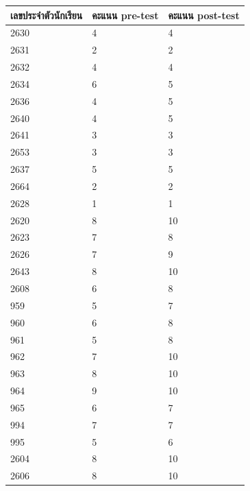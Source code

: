 \begin{table}[h]
    \begin{center}
        \begin{tabular}{ |p{3cm}|p{2cm}|p{2cm}| }
            \hline
            เลขประจำตัวนักเรียน & คะแนน pre-test & คะแนน post-test\\
            \hline
            2630 & 4 & 4\\
            \hline
            2631 & 2 & 2\\
            \hline
            2632 & 4 & 4\\
            \hline
            2634 & 6 & 5\\
            \hline
            2636 & 4 & 5\\
            \hline
            2640 & 4 & 5\\
            \hline
            2641 & 3 & 3\\
            \hline
            2653 & 3 & 3\\
            \hline
            2637 & 5 & 5\\
            \hline
            2664 & 2 & 2\\
            \hline
            2628 & 1 & 1\\
            \hline
            2620 & 8 & 10\\
            \hline
            2623 & 7 & 8\\
            \hline
            2626 & 7 & 9\\
            \hline
            2643 & 8 & 10\\
            \hline
            2608 & 6 & 8\\
            \hline
            959 & 5 & 7\\
            \hline
            960 & 6 & 8\\
            \hline
            961 & 5 & 8\\
            \hline
            962 & 7 & 10\\
            \hline
            963 & 8 & 10\\
            \hline
            964 & 9 & 10\\
            \hline
            965 & 6 & 7\\
            \hline
            994 & 7 & 7\\
            \hline
            995 & 5 & 6\\
            \hline
            2604 & 8 & 10\\
            \hline
            2606 & 8 & 10\\

\end{tabular}
\end{center}
\end{table}
